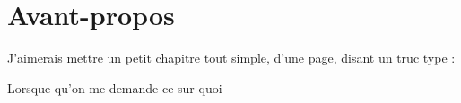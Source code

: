 \chapter{Avant-propos}






J'aimerais mettre un petit chapitre tout simple, d'une page, disant un truc type :

Lorsque qu'on me demande ce sur quoi 









